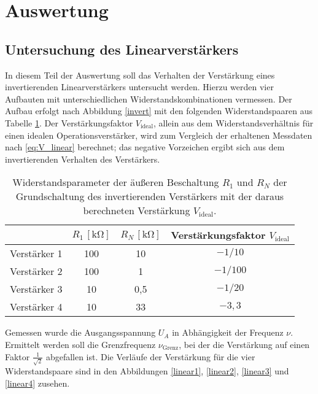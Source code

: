 \section{Auswertung}
\subsection{Untersuchung des Linearverstärkers}
In diesem Teil der Auswertung soll das Verhalten der Verstärkung eines invertierenden Linearverstärkers untersucht werden.
Hierzu werden vier Aufbauten mit unterschiedlichen Widerstandskombinationen vermessen.
Der Aufbau erfolgt nach Abbildung \ref{invert} mit den folgenden Widerstandspaaren aus Tabelle \ref{Tab_2}.
Der Verstärkungsfaktor $V_\text{ideal}$, allein aus dem Widerstandsverhältnis für einen idealen Operationsverstärker, wird zum Vergleich der erhaltenen Messdaten nach \eqref{eq:V_linear} berechnet; das negative Vorzeichen ergibt sich aus dem invertierenden Verhalten des Verstärkers.
\begin{table}[]
\centering
\begin{tabular}{c|ccc}
&$R_1\,[\si{\kilo\ohm}]$&$R_N\,[\si{\kilo\ohm}]$&Verstärkungsfaktor $V_\text{ideal}$\\
\hline
Verstärker 1 & 100 & 10  &$-1/10$\\
Verstärker 2 & 100 & 1   &$-1/100$\\
Verstärker 3 & 10  & 0,5 &$-1/20$\\
Verstärker 4 & 10  & 33  &$-3{,}3$
\end{tabular}
\caption{Widerstandsparameter der äußeren Beschaltung $R_1$ und $R_N$ der Grundschaltung des invertierenden Verstärkers mit der daraus berechneten Verstärkung $V_\text{ideal}$.}
\label{Tab_2}
\end{table}
Gemessen wurde die Ausgangsspannung $U_A$ in Abhängigkeit der Frequenz $\nu$.
Ermittelt werden soll die Grenzfrequenz $\nu_\text{Grenz}$, bei der die Verstärkung auf einen Faktor $\frac{1}{\sqrt{2}}$ abgefallen ist. Die Verläufe der Verstärkung für die vier Widerstandspaare sind in den Abbildungen \ref{linear1}, \ref{linear2}, \ref{linear3} und \ref{linear4} zusehen.

